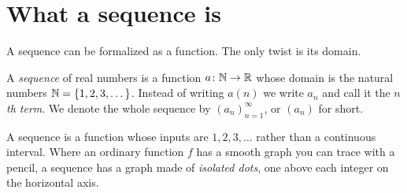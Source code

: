 \chapterline

\section{What a sequence is}
\label{ch28:what-is-a-sequence}

A sequence can be formalized as a function. The only twist is its domain.

\begin{definition}[Sequence]
\label{ch28:def-sequence}
A \emph{sequence} of real numbers is a function $a \colon \mathbb{N} \to \mathbb{R}$ whose
domain is the natural numbers $\mathbb{N} = \{1, 2, 3, \dots\}$. Instead of writing
$a(n)$ we write $a_n$ and call it the \emph{$n$th term}. We denote the whole
sequence by $(a_n)_{n=1}^{\infty}$, or $(a_n)$ for short.
\end{definition}

A sequence is a function whose inputs are $1, 2, 3, \dots$ rather than a
continuous interval. Where an ordinary function $f$ has a smooth graph you can
trace with a pencil, a sequence has a graph made of \emph{isolated dots}, one
above each integer on the horizontal axis.

